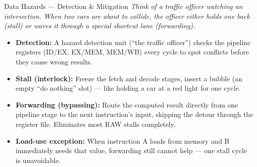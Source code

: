\documentclass{beamer}
\begin{document}
\begin{frame}{Data Hazards --- Detection \& Mitigation}
  \textit{Think of a traffic officer watching an intersection. When two cars
  are about to collide, the officer either holds one back (stall) or waves it
  through a special shortcut lane (forwarding).}

  \medskip
  \begin{itemize}
    \item \textbf{Detection:} A hazard detection unit (``the traffic officer'')
          checks the pipeline registers (ID/EX, EX/MEM, MEM/WB) every cycle
          to spot conflicts before they cause wrong results.
    \item \textbf{Stall (interlock):} Freeze the fetch and decode stages,
          insert a bubble (an empty ``do nothing'' slot) --- like holding a car
          at a red light for one cycle.
    \item \textbf{Forwarding (bypassing):} Route the computed result directly
          from one pipeline stage to the next instruction's input, skipping the
          detour through the register file. Eliminates most RAW stalls completely.
    \item \textbf{Load-use exception:} When instruction A loads from memory and
          B immediately needs that value, forwarding still cannot help --- one
          stall cycle is unavoidable.
  \end{itemize}
\end{frame}
\end{document}
